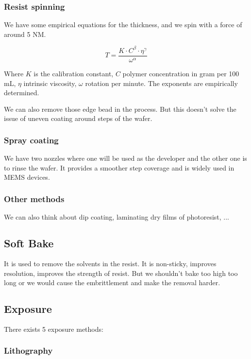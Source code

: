 \documentclass{report}
\begin{document}
\subsubsection{Resist spinning}

We have some empirical equations for the thickness, and we spin with a force of around 5 NM.

\begin{equation}
    T = \frac{K \cdot C^\beta \cdot \eta^\gamma}{\omega^\alpha}
\end{equation}

Where $K$ is the calibration constant, $C$ polymer concentration in gram per 100 mL, $\eta$ intrinsic viscosity, $\omega$ rotation per minute. The exponents are empirically determined.

We can also remove those edge bead in the process. But this doesn't solve the issue of uneven coating around steps of the wafer.

\subsubsection{Spray coating}

We have two nozzles where one will be used as the developer and the other one is to rinse the wafer. It provides a smoother step coverage and is widely used in MEMS devices.

\subsubsection{Other methods}

We can also think about dip coating, laminating dry films of photoresist, ...

\subsection{Soft Bake}

It is used to remove the solvents in the resist. It is non-sticky, improves resolution, improves the strength of resist. But we shouldn't bake too high too long or we would cause the embrittlement and make the removal harder.

\subsection{Exposure}

There exists 5 exposure methods:

\subsubsection{Lithography}
\end{document}
